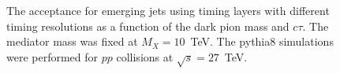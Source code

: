 \begin{figure}
\begin{center}

\end{center}
\caption{
The acceptance for emerging jets using timing layers with different timing resolutions as
a function of the dark pion mass and $c\tau$. The mediator mass was fixed at $M_X = 10$~TeV. The {\sc pythia}8 simulations were performed 
for $pp$ collisions at $\sqrt{s}=27$~TeV. 
}
\label{fig:efficiency}
\end{figure}

